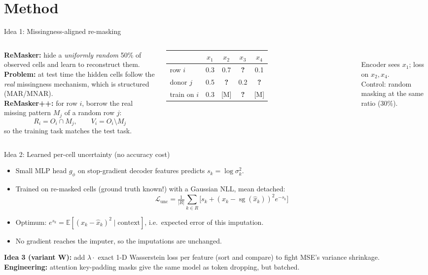 \documentclass[aspectratio=169,11pt]{beamer}
\newcommand{\rmpp}{ReMasker++}
\begin{document}
\section{Method}

\begin{frame}{Idea 1: Missingness-aligned re-masking}
\begin{columns}[T]
\textbf{ReMasker:} hide a \emph{uniformly random} 50\% of observed cells and learn to reconstruct them.\\[4pt]
\textbf{Problem:} at test time the hidden cells follow the \emph{real} missingness mechanism, which is structured (MAR/MNAR).\\[4pt]
\textbf{\rmpp:} for row $i$, borrow the real missing pattern $M_j$ of a random row $j$:
\[ R_i = O_i \cap M_j,\qquad V_i = O_i\setminus M_j \]
so the \alert{training task matches the test task}.
\small
\begin{tabular}{lcccc}
 & $x_1$ & $x_2$ & $x_3$ & $x_4$\\\midrule
row $i$ & 0.3 & 0.7 & \textbf{?} & 0.1\\
donor $j$ & 0.5 & \textbf{?} & 0.2 & \textbf{?}\\\midrule
train on $i$ & 0.3 & \alert{[M]} & \textbf{?} & \alert{[M]}\\
\end{tabular}\\[6pt]
\footnotesize Encoder sees $x_1$; loss on $x_2,x_4$.\\ Control: random masking at the same ratio (30\%).
\end{columns}
\end{frame}

\begin{frame}{Idea 2: Learned per-cell uncertainty (no accuracy cost)}
\begin{itemize}
\item Small MLP head $g_\phi$ on \alert{stop-gradient} decoder features predicts $s_k=\log\sigma_k^2$.
\item Trained on re-masked cells (ground truth known!) with a Gaussian NLL, mean detached:
\[\mathcal{L}_{\text{unc}}=\tfrac{1}{|R|}\textstyle\sum_{k\in R}\big[s_k+(x_k-\operatorname{sg}(\hat x_k))^2e^{-s_k}\big]\]
\item Optimum: $e^{s_k}=\mathbb{E}[(x_k-\hat x_k)^2\mid\text{context}]$, i.e.\ \alert{expected error of this imputation}.
\item No gradient reaches the imputer, so the \alert{imputations are unchanged}.
\end{itemize}
\textbf{Idea 3 (variant W):} add $\lambda\cdot$ exact 1-D Wasserstein loss per feature (sort and compare) to fight MSE's variance shrinkage.\\
\textbf{Engineering:} attention key-padding masks give the same model as token dropping, but batched.
\end{frame}
\end{document}
